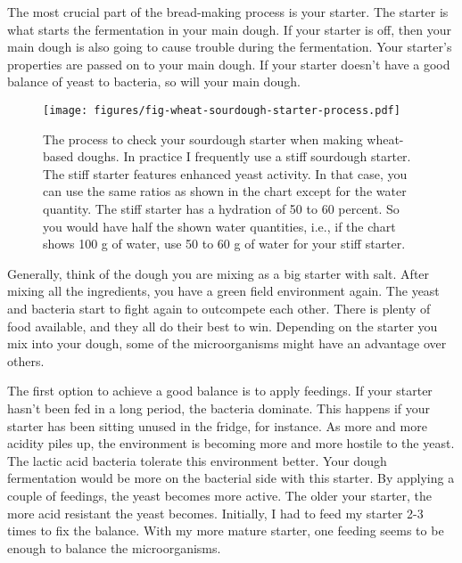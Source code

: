 The most crucial part of the bread-making process is your starter.
The starter is what starts the fermentation in your main dough.
If your starter is off, then your main dough is also going
to cause trouble during the fermentation. Your starter's
properties are passed on to your main dough. If your starter
doesn't have a good balance of yeast to bacteria, so will your
main dough.

\begin{figure}[!htb]
  \texttt{[image: figures/fig-wheat-sourdough-starter-process.pdf]}
  \caption{The process to check your sourdough starter when making wheat-based doughs. In practice
  I frequently use a stiff sourdough starter. The stiff starter features enhanced yeast activity. In that case, you can
  use the same ratios as shown in the chart except for the water quantity. The stiff starter has a hydration of 50 to
  60 percent. So you would have half the shown water quantities, i.e., if the chart shows 100 g of water, use 50 to 60 g of water
  for your stiff starter.}
  \label{fig:process-starter-wheat-sourdough}
\end{figure}

Generally, think of the dough you are mixing as a big starter with salt.
After mixing all the ingredients, you have a green field environment again.
The yeast and bacteria start to fight again to outcompete each other.
There is plenty of food available, and they all do their best to win.
Depending on the starter you mix into your dough, some of the microorganisms
might have an advantage over others.

The first option to achieve a good balance is to apply feedings.
If your starter hasn't been fed in a long period, the
bacteria dominate. This happens if your starter has been
sitting unused in the fridge, for instance. As more and more
acidity piles up, the environment is becoming more and more hostile
to the yeast. The lactic acid bacteria tolerate this environment
better. Your dough fermentation would be more on the
bacterial side with this starter. By applying a couple of
feedings, the yeast becomes more active. The older your
starter, the more acid resistant the yeast becomes. Initially,
I had to feed my starter 2-3 times to fix the balance. With my
more mature starter, one feeding seems to be enough to balance
the microorganisms.

